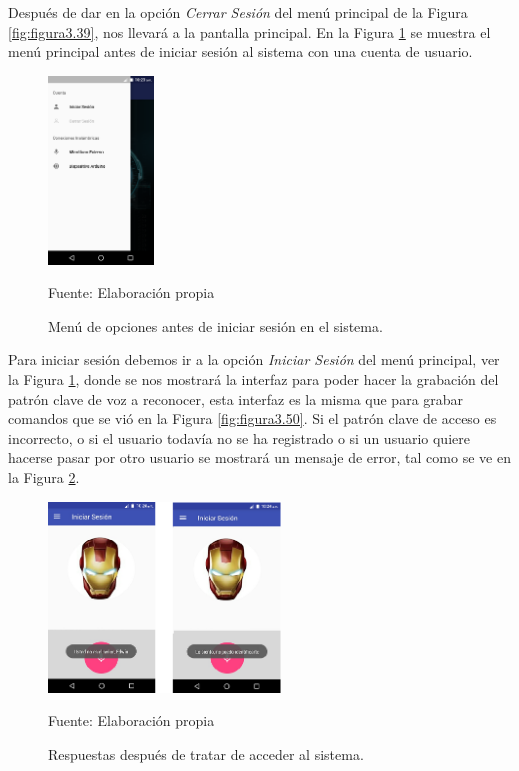 Después de dar en la opción \textit{Cerrar Sesión} del menú principal de la Figura \ref{fig:figura3.39}, nos llevará a la pantalla principal. En la Figura \ref{fig:figura3.53} se muestra el menú principal antes de iniciar sesión al sistema con una cuenta de usuario.

\begin{figure}[H]
\captionsetup{justification=centering}
\begin{center}
\includegraphics[width=0.25\textwidth]{Imagenes/Cap3/image053}
\end{center}
\begin{center}
\vskip -0.5cm
\caption{\small{Menú de opciones antes de iniciar sesión en el sistema.}}
\label{fig:figura3.53}
{\small{Fuente: Elaboración propia}}
\end{center}
\end{figure}

Para iniciar sesión debemos ir a la opción \textit{Iniciar Sesión} del menú principal, ver la Figura \ref{fig:figura3.53}, donde se nos mostrará la interfaz para poder hacer la grabación del patrón clave de voz a reconocer, esta interfaz es la misma que para grabar comandos que se vió en la Figura \ref{fig:figura3.50}. Si el patrón clave de acceso es incorrecto, o si el usuario todavía no se ha registrado o si un usuario quiere hacerse pasar por otro usuario se mostrará un mensaje de error, tal como se ve en la Figura \ref{fig:figura3.54}.
\begin{figure}[H]
\captionsetup{justification=centering}
\begin{center}
\includegraphics[width=0.55\textwidth]{Imagenes/Cap3/image054}
\end{center}
\begin{center}
\vskip -0.5cm
\caption{\small{Respuestas después de tratar de acceder al sistema.}}
\label{fig:figura3.54}
{\small{Fuente: Elaboración propia}}
\end{center}
\end{figure}

